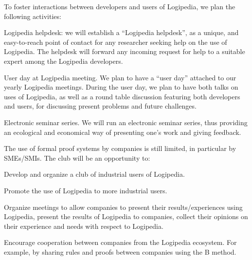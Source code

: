 \begin{workpackage}[id=dissemination,type=MGT,wphases=1-48,
  short={Dissemination},
  title={Dissemination, communication and exploitation},
  lead=Lie,LieRM=2,InrRM=6,BirRM=4,CleRM=2,ImtRM=2,StrRM=2,ZibRM=14,EduRM=12]
\begin{tasklist}
  \begin{task}[id=researchers-club,
      title=Expanding the use of Logipedia in research,
      lead=Bir,BirRM=2,wphases=1-48!.05]
     To foster interactions between developers and users of Logipedia, we plan the following activities:
    \begin{compactitem}
     \item Logipedia helpdesk:
    we will establish a ``Logipedia helpdesk'', as a unique, and easy-to-reach point of contact for any researcher seeking help on the use of Logipedia.
     The helpdesk will forward any incoming request for help to a suitable expert among the Logipedia developers.
     \item User day at Logipedia meeting.
     We plan to have a ``user day'' attached to our yearly Logipedia meetings.
     During the user day, we plan to have both talks on uses of Logipedia, as well as a round table discussion featuring both developers and users, for discussing present problems and future challenges.
     \item Electronic seminar series.
     We will run an electronic seminar series, thus providing an ecological and economical way of presenting one's work and giving feedback.
    \end{compactitem}
  \end{task}

  \begin{task}[id=industrial-club,
    title=Expanding the use of Logipedia in the industry,
    lead=Inr,InrRM=2,wphases=1-48!.05]
    The use of formal proof systems by companies is still limited, in particular by SMEs/SMIs. The club will be an opportunity to:
    \begin{compactitem}
    \item Develop and organize a club of industrial users of Logipedia.
    \item Promote the use of Logipedia to more industrial users.
    \item Organize meetings to allow companies to present their results/experiences using Logipedia, present the results of Logipedia to companies, collect their opinions on their experience and needs with respect to Logipedia.
    \item Encourage cooperation between companies from the Logipedia
      ecosystem. For example, by sharing rules and proofs between companies using the B method.
    \end{compactitem}
  \end{task}


\end{tasklist}
\end{workpackage}
